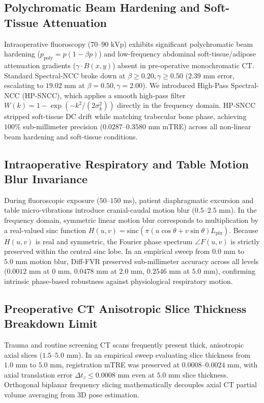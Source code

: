 \documentclass[journal,twocolumn]{IEEEtran}
\begin{document}
\subsection{Polychromatic Beam Hardening and Soft-Tissue Attenuation}
Intraoperative fluoroscopy ($70$--$90\text{ kVp}$) exhibits significant polychromatic beam hardening ($p_{\text{poly}} = p(1 - \beta p)$) and low-frequency abdominal soft-tissue/adipose attenuation gradients ($\gamma \cdot B(x,y)$) absent in pre-operative monochromatic CT. Standard Spectral-NCC broke down at $\beta \ge 0.20, \gamma \ge 0.50$ ($2.39\text{ mm}$ error, escalating to $19.02\text{ mm}$ at $\beta=0.50, \gamma=2.00$). We introduced High-Pass Spectral-NCC (HP-SNCC), which applies a smooth high-pass filter $W(k) = 1 - \exp(-k^2 / (2\sigma_k^2))$ directly in the frequency domain. HP-SNCC stripped soft-tissue DC drift while matching trabecular bone phase, achieving $100\%$ sub-millimeter precision ($0.0287$--$0.3580\text{ mm}$ mTRE) across all non-linear beam hardening and soft-tissue conditions.

\subsection{Intraoperative Respiratory and Table Motion Blur Invariance}
During fluoroscopic exposure ($50$--$150\text{ ms}$), patient diaphragmatic excursion and table micro-vibrations introduce cranial-caudal motion blur ($0.5$--$2.5\text{ mm}$). In the frequency domain, symmetric linear motion blur corresponds to multiplication by a real-valued sinc function $H(u,v) = \text{sinc}(\pi (u \cos\theta + v \sin\theta) L_{\text{pix}})$. Because $H(u,v)$ is real and symmetric, the Fourier phase spectrum $\angle F(u,v)$ is strictly preserved within the central sinc lobe. In an empirical sweep from $0.0\text{ mm}$ to $5.0\text{ mm}$ motion blur, Diff-FVR preserved sub-millimeter accuracy across all levels ($0.0012\text{ mm}$ at $0\text{ mm}$, $0.0478\text{ mm}$ at $2.0\text{ mm}$, $0.2546\text{ mm}$ at $5.0\text{ mm}$), confirming intrinsic phase-based robustness against physiological respiratory motion.

\subsection{Preoperative CT Anisotropic Slice Thickness Breakdown Limit}
Trauma and routine screening CT scans frequently present thick, anisotropic axial slices ($1.5$--$5.0\text{ mm}$). In an empirical sweep evaluating slice thickness from $1.0\text{ mm}$ to $5.0\text{ mm}$, registration mTRE was preserved at $0.0008$--$0.0024\text{ mm}$, with axial translation error $\Delta t_z \le 0.0008\text{ mm}$ even at $5.0\text{ mm}$ slice thickness. Orthogonal biplanar frequency slicing mathematically decouples axial CT partial volume averaging from 3D pose estimation.
\end{document}
